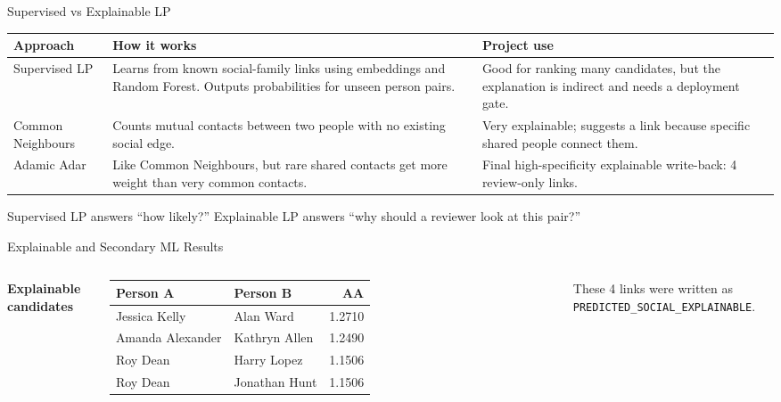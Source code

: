 ﻿\documentclass[aspectratio=169]{beamer}
\newcommand{\tinycode}[1]{\texttt{\scriptsize #1}}
\begin{document}
\begin{frame}{Supervised vs Explainable LP}
  \small
  \begin{table}
    \centering
    \begin{tabular}{p{}p{}p{}}
      \toprule
      \textbf{Approach} & \textbf{How it works} & \textbf{Project use} \\
      \midrule
      Supervised LP & Learns from known social-family links using embeddings and Random Forest. Outputs probabilities for unseen person pairs. & Good for ranking many candidates, but the explanation is indirect and needs a deployment gate. \\
      Common Neighbours & Counts mutual contacts between two people with no existing social edge. & Very explainable; suggests a link because specific shared people connect them. \\
      Adamic Adar & Like Common Neighbours, but rare shared contacts get more weight than very common contacts. & Final high-specificity explainable write-back: 4 review-only links. \\
      \bottomrule
    \end{tabular}
  \end{table}

  \vspace{0.12cm}
  Supervised LP answers ``how likely?'' Explainable LP answers ``why should a reviewer look at this pair?''
\end{frame}

\begin{frame}{Explainable and Secondary ML Results}
  \small
  \begin{columns}[T]
      \textbf{Explainable candidates}\\[3pt]
      \begin{tabular}{llr}
        \toprule
        \textbf{Person A} & \textbf{Person B} & \textbf{AA} \\
        \midrule
        Jessica Kelly & Alan Ward & 1.2710 \\
        Amanda Alexander & Kathryn Allen & 1.2490 \\
        Roy Dean & Harry Lopez & 1.1506 \\
        Roy Dean & Jonathan Hunt & 1.1506 \\
        \bottomrule
      \end{tabular}

      \vspace{0.12cm}
      These 4 links were written as \tinycode{PREDICTED\_SOCIAL\_EXPLAINABLE}.
  \end{columns}
\end{frame}
\end{document}
